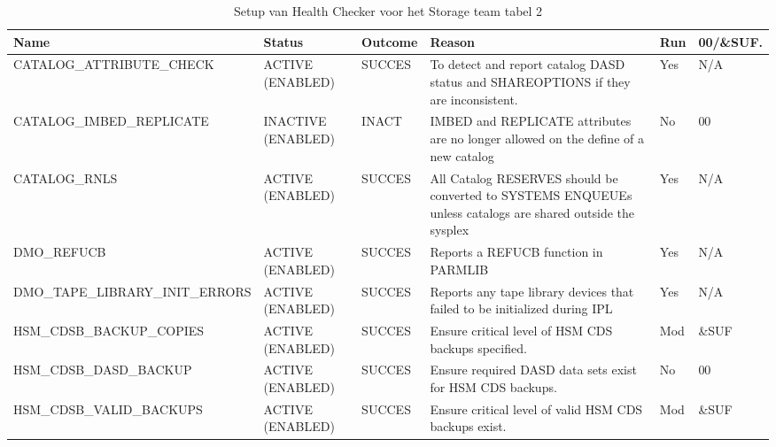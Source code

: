\begin{landscape}
	\begin{table}[h]
		\begin{tabular}{|l|p{2.3cm}|l|p{4.5cm}|l|l|}
			\hline
			\textbf{Name}                       & \textbf{Status}   & \textbf{Outcome} & \textbf{Reason}    & \textbf{Run} &	\textbf{00/\&SUF.} \\ \hline
			CATALOG\_ATTRIBUTE\_CHECK        & ACTIVE (ENABLED)   & SUCCES & To   detect and report catalog DASD status and SHAREOPTIONS if they are   inconsistent.                         & Yes & N/A   \\ \hline
			CATALOG\_IMBED\_REPLICATE        & INACTIVE (ENABLED) & INACT  & IMBED   and REPLICATE attributes are no  longer   allowed on the define of a new catalog                        & No  & 00    \\ \hline
			CATALOG\_RNLS                    & ACTIVE (ENABLED)   & SUCCES & All   Catalog RESERVES should be converted to SYSTEMS ENQUEUEs unless catalogs are   shared outside the sysplex & Yes & N/A   \\ \hline
			DMO\_REFUCB                      & ACTIVE (ENABLED)   & SUCCES & Reports   a REFUCB function in PARMLIB                                                                          & Yes & N/A   \\ \hline
			DMO\_TAPE\_LIBRARY\_INIT\_ERRORS & ACTIVE (ENABLED)   & SUCCES & Reports   any tape library devices that failed to be initialized during IPL                                     & Yes & N/A   \\ \hline
			HSM\_CDSB\_BACKUP\_COPIES        & ACTIVE (ENABLED)   & SUCCES & Ensure critical level of HSM CDS backups specified.                                                             & Mod & \&SUF \\ \hline
			HSM\_CDSB\_DASD\_BACKUP          & ACTIVE (ENABLED)   & SUCCES & Ensure required DASD data sets exist for HSM CDS backups.                                                       & No  & 00    \\ \hline
			HSM\_CDSB\_VALID\_BACKUPS        & ACTIVE (ENABLED)   & SUCCES & Ensure critical level of valid HSM CDS backups exist.                                                           & Mod & \&SUF \\ \hline
		\end{tabular}
		\caption[Health Checker Storage team tabel 2]{Setup van Health Checker voor het Storage team tabel 2}
		\label{tbl:Storage Team Tabel 2}
	\end{table}
\end{landscape}

